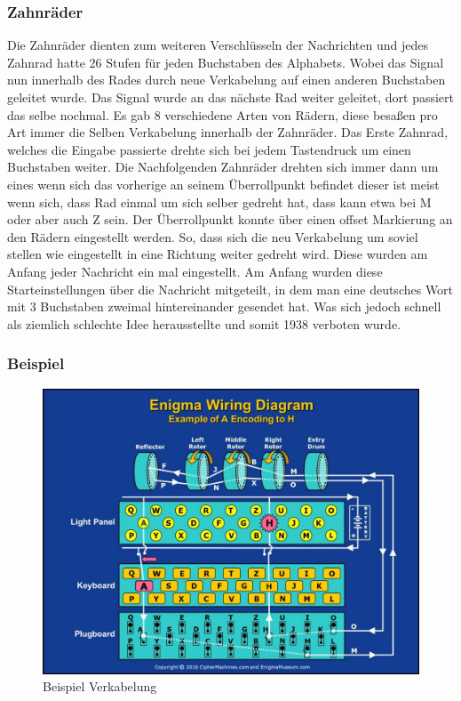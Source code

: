 \subsubsection{Zahnräder}
\label{sec:rader}
Die Zahnräder dienten zum weiteren Verschlüsseln der Nachrichten und jedes Zahnrad hatte 26 Stufen für jeden Buchstaben des Alphabets. Wobei das Signal nun innerhalb des Rades durch neue Verkabelung auf einen anderen Buchstaben geleitet wurde. Das Signal wurde an das nächste Rad weiter geleitet, dort passiert das selbe nochmal. Es gab 8 verschiedene Arten von Rädern, diese besaßen pro Art immer die Selben Verkabelung innerhalb der Zahnräder. Das Erste Zahnrad, welches die Eingabe passierte drehte sich bei jedem Tastendruck um einen Buchstaben weiter. Die Nachfolgenden Zahnräder drehten sich immer dann um eines wenn sich das vorherige an seinem Überrollpunkt befindet dieser ist meist wenn sich, dass Rad einmal um sich selber gedreht hat, dass kann etwa bei M oder aber auch Z sein. Der Überrollpunkt konnte über einen offset Markierung an den Rädern eingestellt werden. So, dass sich die neu Verkabelung um soviel stellen wie eingestellt in eine Richtung weiter gedreht wird. Diese wurden am Anfang jeder Nachricht ein mal eingestellt. Am Anfang wurden diese Starteinstellungen über die Nachricht mitgeteilt, in dem man eine deutsches Wort mit 3 Buchstaben zweimal hintereinander gesendet hat. Was sich jedoch schnell als ziemlich schlechte Idee herausstellte und somit 1938 verboten wurde.

\subsubsection{Beispiel}

\begin{figure}[H]
\centering
\includegraphics[scale=0.2]{Enigma_Maschine_Beispiel.jpg}
\caption{Beispiel Verkabelung}
\label{fig:enigma}
\end{figure}

